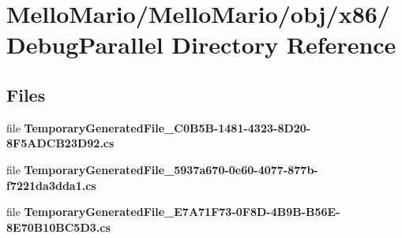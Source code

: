 \section{Mello\+Mario/\+Mello\+Mario/obj/x86/\+Debug\+Parallel Directory Reference}
\label{dir_e6eb18d18072d77460d48ef122976702}
\subsection*{Files}
\begin{DoxyCompactItemize}
\item 
file \textbf{ Temporary\+Generated\+File\+\_\+C0\+B5\+B-\/1481-\/4323-\/8\+D20-\/8\+F5\+A\+D\+C\+B23\+D92.\+cs}
\item 
file \textbf{ Temporary\+Generated\+File\+\_\+5937a670-\/0e60-\/4077-\/877b-\/f7221da3dda1.\+cs}
\item 
file \textbf{ Temporary\+Generated\+File\+\_\+\+E7\+A71\+F73-\/0\+F8\+D-\/4\+B9\+B-\/\+B56\+E-\/8\+E70\+B10\+B\+C5\+D3.\+cs}
\end{DoxyCompactItemize}
